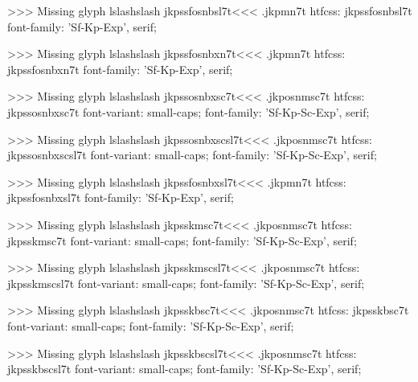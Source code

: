 >>>
Missing glyph	lslashslash
\<jkpssfosnbsl7t\><<<
.jkpmn7t
htfcss:  jkpssfosnbsl7t  font-family: 'Sf-Kp-Exp', serif;

>>>
Missing glyph	lslashslash
\<jkpssfosnbxn7t\><<<
.jkpmn7t
htfcss:  jkpssfosnbxn7t  font-family: 'Sf-Kp-Exp', serif;

>>>
Missing glyph	lslashslash
\<jkpssosnbxsc7t\><<<
.jkposnmsc7t
htfcss:  jkpssosnbxsc7t  font-variant: small-caps; font-family: 'Sf-Kp-Sc-Exp', serif;

>>>
Missing glyph	lslashslash
\<jkpssosnbxscsl7t\><<<
.jkposnmsc7t
htfcss:  jkpssosnbxscsl7t  font-variant: small-caps; font-family: 'Sf-Kp-Sc-Exp', serif;

>>>
Missing glyph	lslashslash
\<jkpssfosnbxsl7t\><<<
.jkpmn7t
htfcss:  jkpssfosnbxsl7t  font-family: 'Sf-Kp-Exp', serif;

>>>
Missing glyph	lslashslash
\<jkpsskmsc7t\><<<
.jkposnmsc7t
htfcss:  jkpsskmsc7t  font-variant: small-caps; font-family: 'Sf-Kp-Sc-Exp', serif;

>>>
Missing glyph	lslashslash
\<jkpsskmscsl7t\><<<
.jkposnmsc7t
htfcss:  jkpsskmscsl7t  font-variant: small-caps; font-family: 'Sf-Kp-Sc-Exp', serif;

>>>
Missing glyph	lslashslash
\<jkpsskbsc7t\><<<
.jkposnmsc7t
htfcss:  jkpsskbsc7t  font-variant: small-caps; font-family: 'Sf-Kp-Sc-Exp', serif;

>>>
Missing glyph	lslashslash
\<jkpsskbscsl7t\><<<
.jkposnmsc7t
htfcss:  jkpsskbscsl7t  font-variant: small-caps; font-family: 'Sf-Kp-Sc-Exp', serif;

